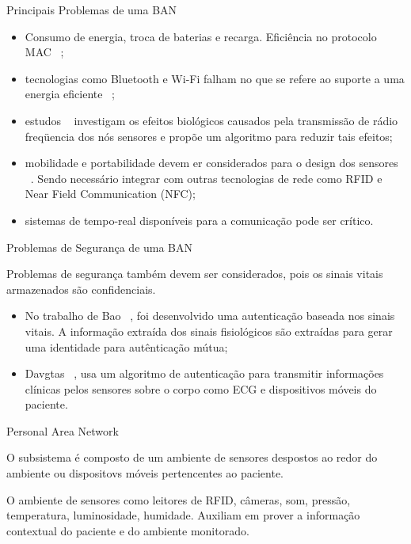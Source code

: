 \documentclass{beamer}
\begin{document}
\begin{frame}{Principais Problemas de uma BAN}
    \begin{block}{}
      \begin{itemize}[<+->]
       \item Consumo de energia, troca de baterias e recarga. Eficiência no protocolo MAC ~\cite{ome07};
       \item tecnologias como Bluetooth e Wi-Fi falham no que se refere ao suporte a uma energia eficiente ~\cite{bha07};
       \item estudos ~\cite{ren06} investigam os efeitos biológicos causados pela transmissão de rádio freqüencia dos nós sensores e propõe um algoritmo para reduzir tais efeitos;
       \item mobilidade e portabilidade devem er considerados para o design dos sensores  ~\cite{seo07}. Sendo necessário integrar com outras tecnologias de rede como RFID  e Near Field Communication (NFC);
       \item sistemas de tempo-real disponíveis para a comunicação pode ser crítico.
      \end{itemize}
    \end{block}
\end{frame}


\begin{frame}{Problemas de Segurança de uma BAN}
    \begin{block}{}
      Problemas de segurança também devem ser considerados, pois os sinais vitais armazenados são confidenciais.
      \begin{itemize}[<+->]
       \item No trabalho de Bao ~\cite{bao05}, foi desenvolvido uma autenticação baseada nos sinais vitais. A informação extraída dos sinais fisiológicos são extraídas para gerar uma identidade para autênticação mútua;
       \item Davgtas ~\cite{dag08}, usa um algoritmo de autenticação para transmitir informações clínicas pelos sensores sobre o corpo como ECG e dispositivos móveis do paciente.
      \end{itemize}
    \end{block}
\end{frame}



\begin{frame}{Personal Area Network}
  \begin{block}{}
      O subsistema é composto de um ambiente de sensores despostos ao redor do ambiente ou dispositovs móveis pertencentes ao paciente.  
  \end{block}

  \begin{block}{}
    O ambiente de sensores como leitores de RFID, câmeras, som, pressão, temperatura, luminosidade, humidade. Auxiliam em prover a informação contextual do paciente e do ambiente monitorado.
  \end{block}
\end{frame}
\end{document}
